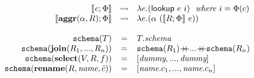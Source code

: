 \[\begin{array}{rcl}
\llbracket \mathit{c};\Phi \rrbracket & \leadsto & \lambda e. (\mathsf{lookup}~e~i)~~\textit{where $i=\Phi(c)$}\\
\llbracket \mathbf{aggr}(\alpha, R);\Phi \rrbracket & \leadsto & \lambda e.(\alpha~(\llbracket R;\Phi\rrbracket~e))\\
\\
\mathtt{schema}(T) & = & T.\mathit{schema}\\
\mathtt{schema}(\mathbf{join}(R_1,...,R_n)) & = & \mathtt{schema}( R_1) \concat ...\concat \mathtt{schema}(R_n)\\
\mathtt{schema}(\mathbf{select}(V, R, f))&=& [\textit{dummy},...,\textit{dummy}]\\
\mathtt{schema}(\mathbf{rename}(R, \textit{name}, \bar{c})) &=& [\textit{name}.c_1,...,\textit{name}.c_n]\\
\end{array}
\]
